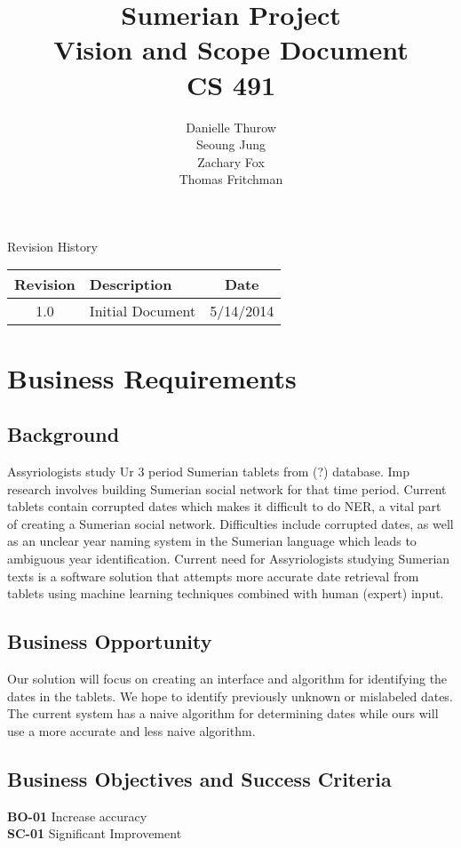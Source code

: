 \documentclass[11pt]{article}
\title{Sumerian Project\\
		Vision and Scope Document\\
		CS 491}
\author{Danielle Thurow \\
		  Seoung Jung\\
		  Zachary Fox\\
		  Thomas Fritchman}
\date{}
\begin{document}
\maketitle
\newpage

\tableofcontents
\newpage

\begin{center}
\Large Revision History\\
\begin{tabularx}{\textwidth}{|c|X|c|}
	\hline
	\textbf{Revision} & \textbf{Description} & \textbf{Date}\\ \hline
	1.0 & Initial Document & 5/14/2014\\ \hline
\end{tabularx}
\end{center}
\newpage

\section{Business Requirements}
\subsection{Background}
Assyriologists study Ur 3 period Sumerian tablets from (?) database. Imp research involves building Sumerian social network for that time period. Current tablets contain corrupted dates which makes it difficult to do NER, a vital part of creating a Sumerian social network. Difficulties include corrupted dates, as well as an unclear year naming system in the Sumerian language which leads to ambiguous year identification. Current need for Assyriologists studying Sumerian texts is a software solution that attempts more accurate date retrieval from tablets using machine learning techniques combined with human (expert) input.
\subsection{Business Opportunity}
Our solution will focus on creating an interface and algorithm for identifying the dates in the tablets. We hope to identify previously unknown or mislabeled dates. The current system has a naive algorithm for determining dates while ours will use a more accurate and less naive algorithm.
\subsection{Business Objectives and Success Criteria}
\textbf{BO-01} Increase accuracy\\
\textbf{SC-01} Significant Improvement
\end{document}
